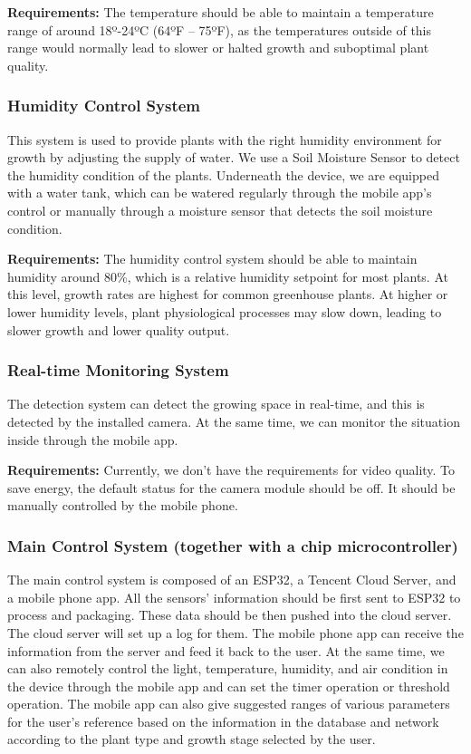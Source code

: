 \textbf{Requirements:}
The temperature should be able to maintain a temperature range of around 18º-24ºC (64ºF – 75ºF), as the temperatures outside of this range would normally lead to slower or halted growth and suboptimal plant quality.\cite{devops_2022}

\subsubsection{Humidity Control System}
This system is used to provide plants with the right humidity environment for growth by adjusting the supply of water. We use a Soil Moisture Sensor to detect the humidity condition of the plants. Underneath the device, we are equipped with a water tank, which can be watered regularly through the mobile app's control or manually through a moisture sensor that detects the soil moisture condition.

\textbf{Requirements:}
The humidity control system should be able to maintain humidity around 80\%, which is a relative humidity setpoint for most plants. At this level, growth rates are highest for common greenhouse plants. At higher or lower humidity levels, plant physiological processes may slow down, leading to slower growth and lower quality output.\cite{devops_2022}

\subsubsection{Real-time Monitoring System}
The detection system can detect the growing space in real-time, and this is detected by the installed camera. At the same time, we can monitor the situation inside through the mobile app.

\textbf{Requirements:}
Currently, we don't have the requirements for video quality. To save energy, the default status for the camera module should be off. It should be manually controlled by the mobile phone.

\subsubsection{Main Control System (together with a chip microcontroller)}
The main control system is composed of an ESP32\cite{wikipedia_2023}, a Tencent Cloud Server, and a mobile phone app. All the sensors' information should be first sent to ESP32 to process and packaging. These data should be then pushed into the cloud server. The cloud server will set up a log for them. The mobile phone app can receive the information from the server and feed it back to the user. At the same time, we can also remotely control the light, temperature, humidity, and air condition in the device through the mobile app and can set the timer operation or threshold operation. The mobile app can also give suggested ranges of various parameters for the user's reference based on the information in the database and network according to the plant type and growth stage selected by the user.

